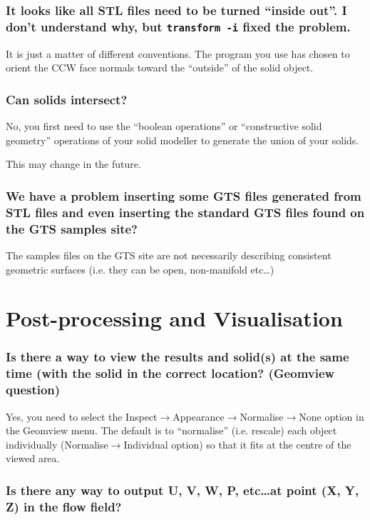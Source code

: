 \documentclass[a4paper]{article}
\begin{document}
\subsubsection{It looks like all STL files need to be turned ``inside out''.  I don't understand why, but {\tt transform -i} fixed the problem.}

It is just a matter of different conventions. The program you use has
chosen to orient the CCW face normals toward the ``outside'' of the
solid object.

\subsubsection{Can solids intersect?}

No, you first need to use the ``boolean operations'' or ``constructive
solid geometry'' operations of your solid modeller to generate the
union of your solids.

This may change in the future.

\subsubsection{We have a problem inserting some GTS files generated 
from STL files and even inserting the standard GTS files found 
on the GTS samples site?}

The samples files on the GTS site are not
necessarily describing consistent geometric surfaces (i.e. they can be
open, non-manifold etc\dots)

\section{Post-processing and Visualisation}

\subsubsection{Is there a way to view the results and solid(s) at the same time (with the 
solid in the correct location? (Geomview question)}

Yes, you need to select the Inspect$\rightarrow$Appearance$\rightarrow$Normalise$\rightarrow$None
option in the Geomview menu. The default is to ``normalise''
(i.e. rescale) each object individually (Normalise$\rightarrow$Individual option)
so that it fits at the centre of the viewed area.

\subsubsection{Is there any way to output U, V, W, P, etc\dots at point (X, Y, Z) in the flow field?}
\end{document}
